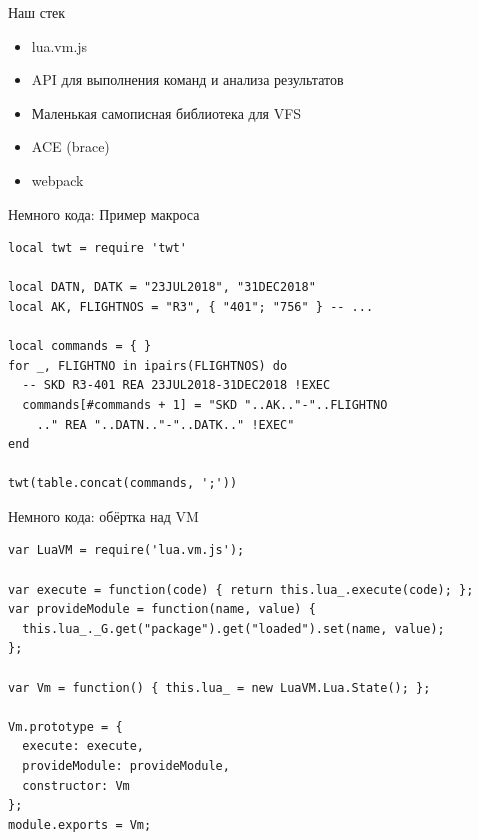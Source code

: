 \documentclass[aspectratio=169,handout,bigger]{beamer}
\begin{document}

\begin{frame}{Наш стек}

\begin{itemize}
\item lua.vm.js
\item API для выполнения команд и анализа результатов
\item Маленькая самописная библиотека для VFS
\item ACE (brace)
\item webpack
\end{itemize}

\end{frame}


\begin{frame}[fragile]{Немного кода: Пример макроса}

\begin{verbatim}
local twt = require 'twt'

local DATN, DATK = "23JUL2018", "31DEC2018"
local AK, FLIGHTNOS = "R3", { "401"; "756" } -- ...

local commands = { }
for _, FLIGHTNO in ipairs(FLIGHTNOS) do
  -- SKD R3-401 REA 23JUL2018-31DEC2018 !EXEC
  commands[#commands + 1] = "SKD "..AK.."-"..FLIGHTNO
    .." REA "..DATN.."-"..DATK.." !EXEC"
end

twt(table.concat(commands, ';'))
\end{verbatim}

\end{frame}


\begin{frame}[fragile]{Немного кода: обёртка над VM}

\begin{verbatim}
var LuaVM = require('lua.vm.js');

var execute = function(code) { return this.lua_.execute(code); };
var provideModule = function(name, value) {
  this.lua_._G.get("package").get("loaded").set(name, value);
};

var Vm = function() { this.lua_ = new LuaVM.Lua.State(); };

Vm.prototype = {
  execute: execute,
  provideModule: provideModule,
  constructor: Vm
};
module.exports = Vm;
\end{verbatim}

\end{frame}
\end{document}
